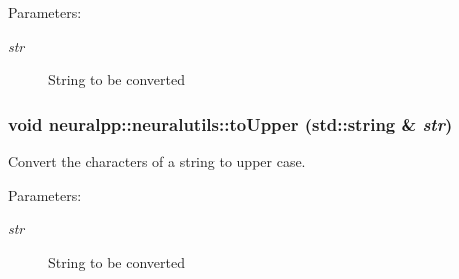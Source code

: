 \begin{Desc}
\item[Parameters:]
\begin{description}
\item[{\em str}]String to be converted \end{description}
\end{Desc}
\subsubsection[toUpper]{\setlength{\rightskip}{0pt plus 5cm}void neuralpp::neuralutils::toUpper (std::string \& {\em str})}\label{namespaceneuralpp_1_1neuralutils_265b22d1a6110646b42693b96c21ca8b}


Convert the characters of a string to upper case. 

\begin{Desc}
\item[Parameters:]
\begin{description}
\item[{\em str}]String to be converted \end{description}
\end{Desc}
